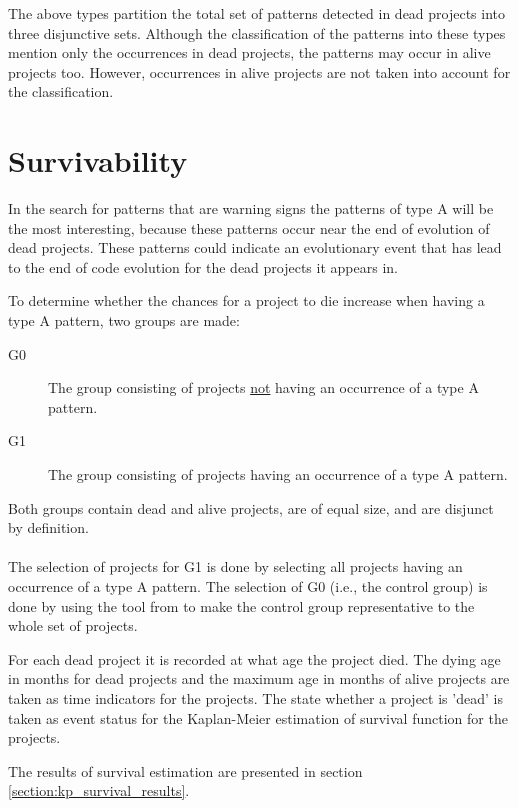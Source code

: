 \vspace{1em}
\noindent
The above types partition the total set of patterns detected in dead projects
into three disjunctive sets. Although the classification of the patterns into
these types mention only the occurrences in dead projects, the patterns may
occur in alive projects too. However, occurrences in alive projects are not
taken into account for the classification.

\section{Survivability}
\label{section:survivability}
In the search for patterns that are warning signs the patterns of type A will
be the most interesting, because these patterns occur near the end of evolution
of dead projects. These patterns could indicate an evolutionary event that has
lead to the end of code evolution for the dead projects it appears in.

To determine whether the chances for a project to die increase when having a
type A pattern, two groups are made:
\begin{description}
	\item[G0] \quad The group consisting of projects \underline{not} having an
		occurrence of a type A pattern.
	\item[G1] \quad The group consisting of projects having an occurrence of a type
		A pattern.
\end{description}

\noindent
Both groups contain dead and alive projects, are of equal size, and are
disjunct by definition.

\paragraph{}
The selection of projects for G1 is done by selecting all projects having an
occurrence of a type A pattern. The selection of G0 (i.e., the control group)
is done by using the tool from \citet{nagappan} to make the control group
representative to the whole set of projects.

For each dead project it is recorded at what age the project died. The dying
age in months for dead projects and the maximum age in months of alive projects
are taken as time indicators for the projects. The state whether a project is
'dead' is taken as event status for the Kaplan-Meier estimation of survival
function for the projects.

The results of survival estimation are presented in section
\ref{section:kp_survival_results}.

